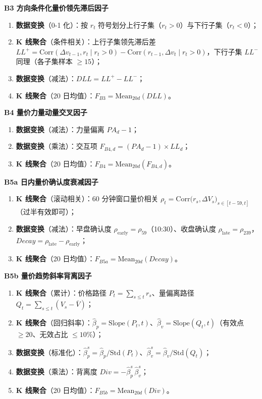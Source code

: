 \documentclass[UTF8,a4paper,zihao=-4,fontset=windows]{ctexart}
\providecommand{\tightlist}{\setlength{\itemsep}{0pt}\setlength{\parskip}{0pt}}
\begin{document}
\textbf{B3 方向条件化量价领先滞后因子}

\begin{enumerate}
\def\labelenumi{\arabic{enumi}.}
\tightlist
\item
  \textbf{数据变换}（0-1 化）：按 \(r_t\)
  符号划分上行子集（\(r_t>0\)）与下行子集（\(r_t<0\)）；
\item
  \textbf{K 线聚合}（条件相关）：上行子集领先滞后差
  \(LL^+=\mathrm{Corr}(\Delta v_{t-1},r_t\mid r_t>0)-\mathrm{Corr}(r_{t-1},\Delta v_t\mid r_t>0)\)，下行子集
  \(LL^-\) 同理（各子集样本 \(\ge15\)）；
\item
  \textbf{数据变换}（减法）：\(DLL=LL^+-LL^-\)；
\item
  \textbf{K 线聚合}（20 日均值）：\(F_{B3}=\mathrm{Mean}_{20d}(DLL)\)。
\end{enumerate}

\textbf{B4 量价力量动量交叉因子}

\begin{enumerate}
\def\labelenumi{\arabic{enumi}.}
\tightlist
\item
  \textbf{数据变换}（减法）：力量偏离 \(PA_d-1\)；
\item
  \textbf{数据变换}（乘法）：交互项 \(F_{B4,d}=(PA_d-1)\times LL_d\)；
\item
  \textbf{K 线聚合}（20
  日均值）：\(F_{B4}=\mathrm{Mean}_{20d}(F_{B4,d})\)。
\end{enumerate}

\textbf{B5a 日内量价确认度衰减因子}

\begin{enumerate}
\def\labelenumi{\arabic{enumi}.}
\tightlist
\item
  \textbf{K 线聚合}（滚动相关）：60 分钟窗口量价相关
  \(\rho_t=\mathrm{Corr}\big(r_s,\Delta V_s\big)_{s\in[t-59,t]}\)（过半有效即可）；
\item
  \textbf{数据变换}（减法）：早盘确认度
  \(\rho_{\mathrm{early}}=\rho_{59}\)（10:30）、收盘确认度
  \(\rho_{\mathrm{late}}=\rho_{239}\)，\(Decay=\rho_{\mathrm{late}}-\rho_{\mathrm{early}}\)；
\item
  \textbf{K 线聚合}（20
  日均值）：\(F_{B5a}=\mathrm{Mean}_{20d}(Decay)\)。
\end{enumerate}

\textbf{B5b 量价趋势斜率背离因子}

\begin{enumerate}
\def\labelenumi{\arabic{enumi}.}
\tightlist
\item
  \textbf{K 线聚合}（累计）：价格路径
  \(P_t=\sum_{s\le t}r_s\)、量偏离路径
  \(Q_t=\sum_{s\le t}(V_s-\bar V)\)；
\item
  \textbf{K
  线聚合}（回归斜率）：\(\hat\beta_p=\mathrm{Slope}(P_t,t)\)、\(\hat\beta_v=\mathrm{Slope}(Q_t,t)\)（有效点
  \(\ge20\)、无效占比 \(\le10\%\)）；
\item
  \textbf{数据变换}（标准化）：\(\hat\beta_p^s=\hat\beta_p/\mathrm{Std}(P_t)\)、\(\hat\beta_v^s=\hat\beta_v/\mathrm{Std}(Q_t)\)；
\item
  \textbf{数据变换}（乘法）：背离度
  \(Div=-\hat\beta_p^s\,\hat\beta_v^s\)；
\item
  \textbf{K 线聚合}（20 日均值）：\(F_{B5b}=\mathrm{Mean}_{20d}(Div)\)。
\end{enumerate}
\end{document}
